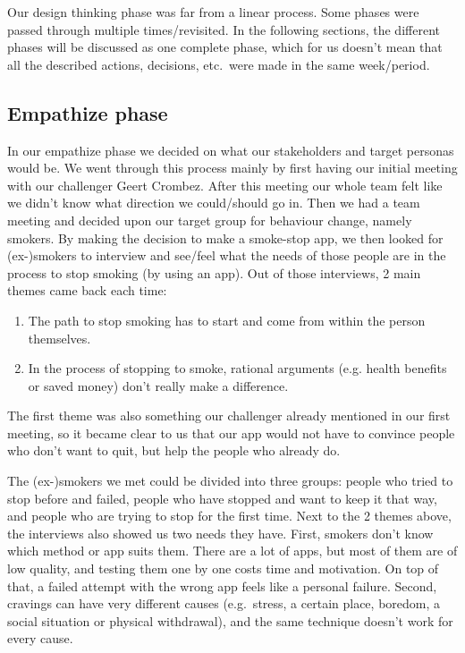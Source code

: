 
Our design thinking phase was far from a linear process.
Some phases were passed through multiple times/revisited.
In the following sections, the different phases will be discussed as one complete phase, which for us doesn't mean that all the described actions, decisions, etc.\ were made in the same week/period.

\subsection{Empathize phase}
\label{subsec:empathize}

In our empathize phase we decided on what our stakeholders and target personas would be.
We went through this process mainly by first having our initial meeting with our challenger Geert Crombez.
After this meeting our whole team felt like we didn't know what direction we could/should go in.
Then we had a team meeting and decided upon our target group for behaviour change, namely smokers.
By making the decision to make a smoke-stop app, we then looked for (ex-)smokers to interview and see/feel what the needs of those people are in the process to stop smoking (by using an app).
Out of those interviews, 2 main themes came back each time:
\begin{enumerate}
    \item The path to stop smoking has to start and come from within the person themselves.
    \item In the process of stopping to smoke, rational arguments (e.g. health benefits or saved money) don't really make a difference.
\end{enumerate}
The first theme was also something our challenger already mentioned in our first meeting, so it became clear to us that our app would not have to convince people who don't want to quit, but help the people who already do.

The (ex-)smokers we met could be divided into three groups: people who tried to stop before and failed, people who have stopped and want to keep it that way, and people who are trying to stop for the first time.
Next to the 2 themes above, the interviews also showed us two needs they have.
First, smokers don't know which method or app suits them.
There are a lot of apps, but most of them are of low quality, and testing them one by one costs time and motivation.
On top of that, a failed attempt with the wrong app feels like a personal failure.
Second, cravings can have very different causes (e.g.\ stress, a certain place, boredom, a social situation or physical withdrawal), and the same technique doesn't work for every cause.

